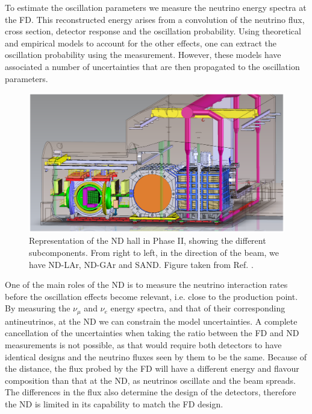 To estimate the oscillation parameters we measure the neutrino energy spectra at the FD. This reconstructed energy arises from a convolution of the neutrino flux, cross section, detector response and the oscillation probability. Using theoretical and empirical models to account for the other effects, one can extract the oscillation probability using the measurement. However, these models have associated a number of uncertainties that are then propagated to the oscillation parameters.

\begin{figure}[t]
	\centering
	\includegraphics[width=0.95\linewidth]{Images/DUNE/ND/nd_hall}
	\caption[Representation of the ND hall in Phase II.]{Representation of the ND hall in Phase II, showing the different subcomponents. From right to left, in the direction of the beam, we have ND-LAr, ND-GAr and SAND. Figure taken from Ref. \cite{DUNE2021NDCDR}.}
	\label{fig:dune_nd}
\end{figure}

One of the main roles of the ND is to measure the neutrino interaction rates before the oscillation effects become relevant, i.e. close to the production point. By measuring the $\nu_{\mu}$ and $\nu_{e}$ energy spectra, and that of their corresponding antineutrinos, at the ND we can constrain the model uncertainties. A complete cancellation of the uncertainties when taking the ratio between the FD and ND measurements is not possible, as that would require both detectors to have identical designs and the neutrino fluxes seen by them to be the same. Because of the distance, the flux probed by the FD will have a different energy and flavour composition than that at the ND, as neutrinos oscillate and the beam spreads. The differences in the flux also determine the design of the detectors, therefore the ND is limited in its capability to match the FD design.

